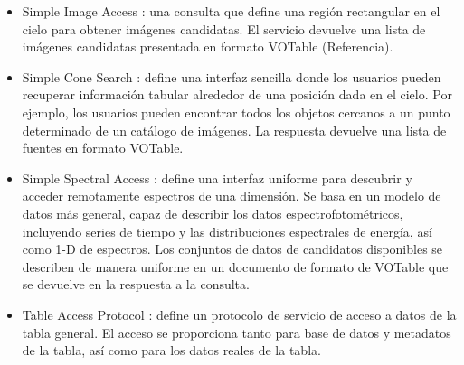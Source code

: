 \begin{itemize}
	\item Simple Image Access \cite{sia}: una consulta que define una región
rectangular en el cielo para obtener imágenes candidatas. El servicio devuelve
una lista de imágenes candidatas presentada en formato VOTable (Referencia).
	\item Simple Cone Search \cite{scs}: define una interfaz sencilla donde los
usuarios pueden recuperar información tabular alrededor de una posición dada en
el cielo. Por ejemplo, los usuarios pueden encontrar todos los objetos cercanos
a un punto determinado de un catálogo de imágenes. La respuesta devuelve una
lista de fuentes en formato VOTable.
	\item Simple Spectral Access \cite{ssa}: define una interfaz uniforme para
descubrir y acceder remotamente espectros de una dimensión. Se basa en un
modelo de datos más general, capaz de describir los datos espectrofotométricos,
incluyendo series de tiempo y las distribuciones espectrales de energía, así
como 1-D de espectros. Los conjuntos de datos de candidatos disponibles se
describen de manera uniforme en un documento de formato de VOTable que se
devuelve en la respuesta a la consulta.
	\item Table Access Protocol \cite{tap}: define un protocolo de servicio de acceso
a datos de la tabla general. El acceso se proporciona tanto para base de datos
y metadatos de la tabla, así como para los datos reales de la tabla.
\end{itemize}
